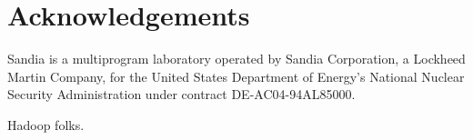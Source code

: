 \section{Acknowledgements}

Sandia is a multiprogram laboratory operated by Sandia Corporation, a
Lockheed Martin Company, for the United States Department of
Energy's National Nuclear Security Administration under contract
DE-AC04-94AL85000.

Hadoop folks.
